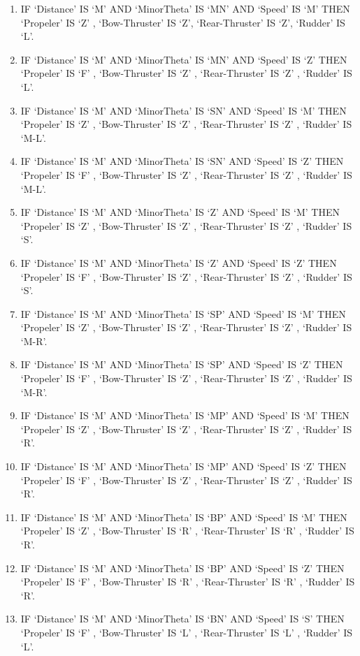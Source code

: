 \begin{enumerate}
\item	IF ‘Distance’ IS  ‘M’  AND  ‘MinorTheta’ IS ‘MN’  AND ‘Speed’ IS ‘M’ THEN ‘Propeler’ IS ‘Z’ ,  ‘Bow-Thruster’ IS ‘Z’,  ‘Rear-Thruster’ IS  ‘Z’,  ‘Rudder’ IS ‘L’.
\item	IF ‘Distance’ IS  ‘M’  AND  ‘MinorTheta’ IS ‘MN’  AND ‘Speed’ IS ‘Z’  THEN ‘Propeler’ IS ‘F’  ,  ‘Bow-Thruster’ IS ‘Z’ ,  ‘Rear-Thruster’ IS  ‘Z’ ,  ‘Rudder’ IS ‘L’.
\item	IF ‘Distance’ IS  ‘M’  AND  ‘MinorTheta’ IS ‘SN’  AND ‘Speed’ IS ‘M’  THEN ‘Propeler’ IS ‘Z’  ,  ‘Bow-Thruster’ IS ‘Z’ ,  ‘Rear-Thruster’ IS  ‘Z’ ,  ‘Rudder’ IS ‘M-L’.
\item	IF ‘Distance’ IS  ‘M’  AND  ‘MinorTheta’ IS ‘SN’  AND ‘Speed’ IS ‘Z’  THEN ‘Propeler’ IS ‘F’   ,  ‘Bow-Thruster’ IS ‘Z’ ,  ‘Rear-Thruster’ IS  ‘Z’ ,  ‘Rudder’ IS ‘M-L’.
\item	IF ‘Distance’ IS  ‘M’  AND  ‘MinorTheta’ IS ‘Z’   AND ‘Speed’ IS ‘M’  THEN ‘Propeler’ IS ‘Z’  ,  ‘Bow-Thruster’ IS ‘Z’ ,  ‘Rear-Thruster’ IS  ‘Z’ ,  ‘Rudder’ IS ‘S’.
\item	IF ‘Distance’ IS  ‘M’  AND  ‘MinorTheta’ IS ‘Z’   AND ‘Speed’ IS ‘Z’  THEN  ‘Propeler’ IS ‘F’   ,  ‘Bow-Thruster’ IS ‘Z’ ,  ‘Rear-Thruster’ IS  ‘Z’ ,  ‘Rudder’ IS ‘S’.
\item	IF ‘Distance’ IS  ‘M’  AND  ‘MinorTheta’ IS ‘SP’   AND ‘Speed’ IS ‘M’  THEN ‘Propeler’ IS ‘Z’  ,  ‘Bow-Thruster’ IS ‘Z’ ,  ‘Rear-Thruster’ IS  ‘Z’ ,  ‘Rudder’ IS ‘M-R’.
\item	IF ‘Distance’ IS  ‘M’  AND  ‘MinorTheta’ IS ‘SP’   AND ‘Speed’ IS ‘Z’  THEN  ‘Propeler’ IS ‘F’   ,  ‘Bow-Thruster’ IS ‘Z’ ,  ‘Rear-Thruster’ IS  ‘Z’ ,  ‘Rudder’ IS ‘M-R’.
\item	IF ‘Distance’ IS  ‘M’  AND  ‘MinorTheta’ IS ‘MP’   AND ‘Speed’ IS ‘M’  THEN ‘Propeler’ IS ‘Z’  ,  ‘Bow-Thruster’ IS ‘Z’ ,  ‘Rear-Thruster’ IS  ‘Z’ ,  ‘Rudder’ IS ‘R’.
\item	IF ‘Distance’ IS  ‘M’  AND  ‘MinorTheta’ IS ‘MP’   AND ‘Speed’ IS ‘Z’  THEN  ‘Propeler’ IS ‘F’   ,  ‘Bow-Thruster’ IS ‘Z’ ,  ‘Rear-Thruster’ IS  ‘Z’ ,  ‘Rudder’ IS ‘R’.
\item	IF ‘Distance’ IS  ‘M’  AND  ‘MinorTheta’ IS ‘BP’   AND ‘Speed’ IS ‘M’  THEN ‘Propeler’ IS ‘Z’  ,  ‘Bow-Thruster’ IS ‘R’ ,  ‘Rear-Thruster’ IS  ‘R’ ,  ‘Rudder’ IS ‘R’.
\item	IF ‘Distance’ IS  ‘M’  AND  ‘MinorTheta’ IS ‘BP’   AND ‘Speed’ IS ‘Z’  THEN  ‘Propeler’ IS ‘F’   ,  ‘Bow-Thruster’ IS ‘R’ ,  ‘Rear-Thruster’ IS  ‘R’ ,  ‘Rudder’ IS ‘R’.
\item	IF ‘Distance’ IS  ‘M’  AND  ‘MinorTheta’ IS ‘BN’   AND ‘Speed’ IS ‘S’  THEN ‘Propeler’ IS ‘F’  ,  ‘Bow-Thruster’ IS ‘L’ ,  ‘Rear-Thruster’ IS  ‘L’ ,  ‘Rudder’ IS ‘L’.

\end{enumerate}
